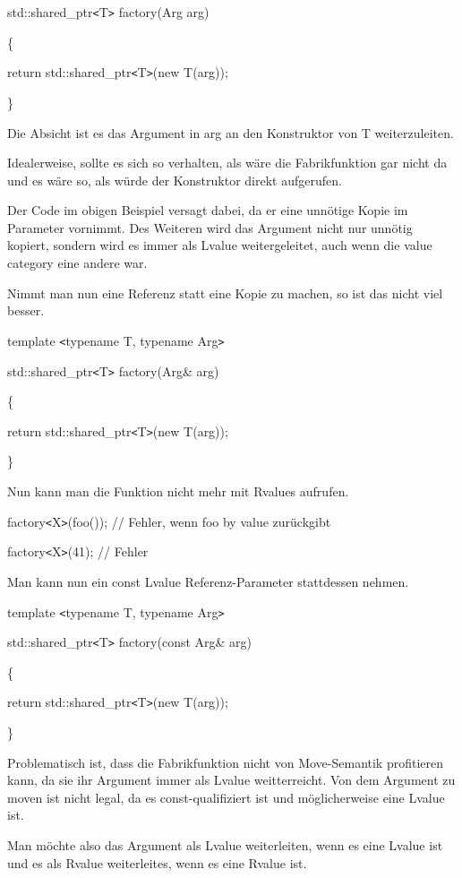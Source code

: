 \documentclass{article}
\begin{document}
std::shared\_ptr\texttt{<}T\texttt{>} factory(Arg arg)

\{    

\parindent=14pt
return std::shared\_ptr\texttt{<}T\texttt{>}(new T(arg));

\parindent=0pt
\}

Die Absicht ist es das Argument in arg an den Konstruktor von T weiterzuleiten.

Idealerweise, sollte es sich so verhalten, als wäre die Fabrikfunktion gar nicht 
da und es wäre so, als würde der Konstruktor direkt aufgerufen.

Der Code im obigen Beispiel versagt dabei, da er eine unnötige Kopie im Parameter 
vornimmt. Des Weiteren wird das Argument nicht nur unnötig kopiert, sondern wird 
es immer als Lvalue weitergeleitet, auch wenn die value category eine andere war.

Nimmt man nun eine Referenz statt eine Kopie zu machen, so ist das nicht viel besser.

template \texttt{<}typename T, typename Arg\texttt{>}

std::shared\_ptr\texttt{<}T\texttt{>} factory(Arg\& arg)

\{    

\parindent=14pt
return std::shared\_ptr\texttt{<}T\texttt{>}(new T(arg));

\parindent=0pt
\}

Nun kann man die Funktion nicht mehr mit Rvalues aufrufen.

factory\texttt{<}X\texttt{>}(foo()); // Fehler, wenn foo by value zurückgibt

factory\texttt{<}X\texttt{>}(41);    // Fehler

Man kann nun ein const Lvalue Referenz-Parameter stattdessen nehmen.

template \texttt{<}typename T, typename Arg\texttt{>}

std::shared\_ptr\texttt{<}T\texttt{>} factory(const Arg\& arg) 

\{    

\parindent=14pt
return std::shared\_ptr\texttt{<}T\texttt{>}(new T(arg));

\parindent=0pt
\}

Problematisch ist, dass die Fabrikfunktion nicht von Move-Semantik profitieren 
kann, da sie ihr Argument immer als Lvalue weitterreicht. Von dem Argument zu moven 
ist nicht legal, da es const-qualifiziert ist und möglicherweise eine Lvalue ist.

Man möchte also das Argument als Lvalue weiterleiten, wenn es eine Lvalue ist 
und es als Rvalue weiterleites, wenn es eine Rvalue ist.
\end{document}
